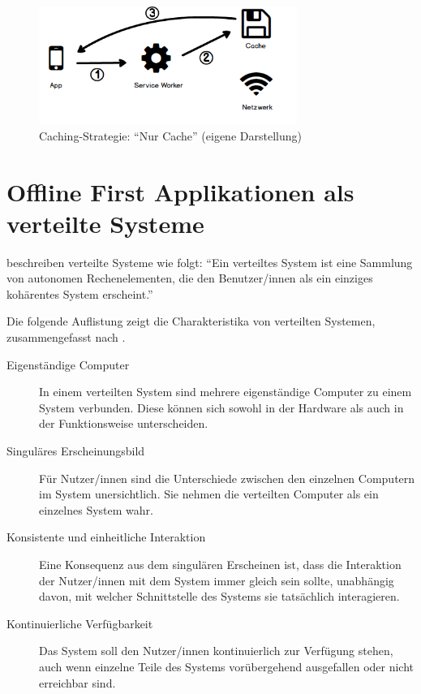 \documentclass[a4paper, 12pt]{scrreprt}
\begin{document}
\begin{figure}[H]
	\centering
	\includegraphics[width=0.75\textwidth]{cacheonly.png}
	\caption[Caching-Strategie: \enquote{Nur Cache}]{Caching-Strategie: \enquote{Nur Cache} (eigene Darstellung)}
	\label{fig:cachingCacheOnly}
\end{figure}

\section{Offline First Applikationen als verteilte Systeme}\label{sec:OfflineFirstVerteiteSysteme}
\citet{ArticleDistributedSystems} beschreiben verteilte Systeme wie folgt: \enquote{Ein verteiltes System ist eine Sammlung von autonomen Rechenelementen, die den Benutzer/innen als ein einziges kohärentes System erscheint.}

Die folgende Auflistung zeigt die Charakteristika von verteilten Systemen, zusammengefasst nach \citet[S. 2-3]{BookDistributedSystemsDefinition}.

\begin{description}
\item[Eigenständige Computer] In einem verteilten System sind mehrere eigenständige Computer zu einem System verbunden. Diese können sich sowohl in der Hardware als auch in der Funktionsweise unterscheiden. 
\item[Singuläres Erscheinungsbild] Für Nutzer/innen sind die Unterschiede zwischen den einzelnen Computern im System unersichtlich. Sie nehmen die verteilten Computer als ein einzelnes System wahr. 
\item[Konsistente und einheitliche Interaktion]
	Eine Konsequenz aus dem singulären Erscheinen ist, dass die Interaktion der Nutzer/innen mit dem System immer gleich sein sollte, unabhängig davon, mit welcher Schnittstelle des Systems sie tatsächlich interagieren. 
\item[Kontinuierliche Verfügbarkeit]
	Das System soll den Nutzer/innen kontinuierlich zur Verfügung stehen, auch wenn einzelne Teile des Systems vorübergehend ausgefallen oder nicht erreichbar sind.
\end{description}
\label{tab:charakteristikaDistributedSystem}
\end{document}
